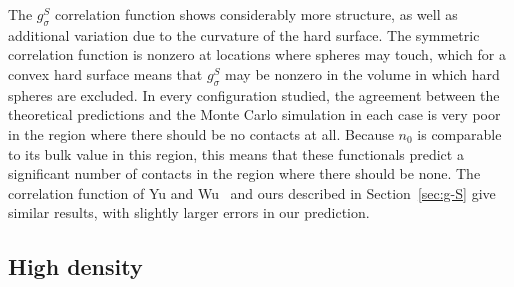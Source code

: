 \documentclass[letterpaper,twocolumn,amsmath,amssymb,pre]{revtex4-1}
\begin{document}
The $g_\sigma^S$ correlation function shows considerably more
structure, as well as additional variation due to the curvature of the
hard surface.  The symmetric correlation function is nonzero at
locations where spheres may touch, which for a convex hard surface
means that $g_\sigma^S$ may be nonzero in the volume in which hard
spheres are excluded.  In every configuration studied, the agreement
between the theoretical predictions and the Monte Carlo simulation in
each case is very poor in the region where there should be no contacts
at all.  Because $n_0$ is comparable to its bulk value in this region,
this means that these functionals predict a significant number of
contacts in the region where there should be none.  The correlation
function of Yu and Wu~\cite{yu2002fmt-dft-inhomogeneous-associating}
and ours described in Section~\ref{sec:g-S} give similar results, with
slightly larger errors in our prediction.






\subsection{High density}

\end{document}
